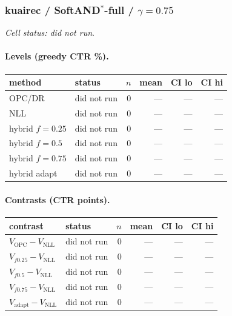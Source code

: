 \documentclass[10pt,a4paper]{article}
\begin{document}
\subsubsection{kuairec / SoftAND$^*$-full / $\gamma=0.75$}
\emph{Cell status: did not run}.
\paragraph{Levels (greedy CTR \%).}
{\centering\small\begin{tabular}{llrrrr}
\toprule method & status & $n$ & mean & CI lo & CI hi \\
\midrule
OPC/DR & did not run & 0 & --- & --- & --- \\
NLL & did not run & 0 & --- & --- & --- \\
hybrid $f{=}0.25$ & did not run & 0 & --- & --- & --- \\
hybrid $f{=}0.5$ & did not run & 0 & --- & --- & --- \\
hybrid $f{=}0.75$ & did not run & 0 & --- & --- & --- \\
hybrid adapt & did not run & 0 & --- & --- & --- \\
\bottomrule\end{tabular}\par}
\paragraph{Contrasts (CTR points).}
{\centering\small\begin{tabular}{llrrrr}
\toprule contrast & status & $n$ & mean & CI lo & CI hi \\
\midrule
$V_{\mathrm{OPC}}-V_{\mathrm{NLL}}$ & did not run & 0 & --- & --- & --- \\
$V_{f0.25}-V_{\mathrm{NLL}}$ & did not run & 0 & --- & --- & --- \\
$V_{f0.5}-V_{\mathrm{NLL}}$ & did not run & 0 & --- & --- & --- \\
$V_{f0.75}-V_{\mathrm{NLL}}$ & did not run & 0 & --- & --- & --- \\
$V_{\mathrm{adapt}}-V_{\mathrm{NLL}}$ & did not run & 0 & --- & --- & --- \\
\bottomrule\end{tabular}\par}
\end{document}

